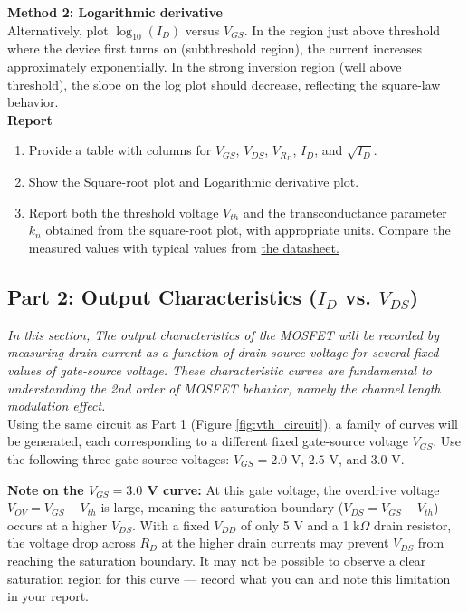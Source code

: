 \documentclass[10pt]{article}
\begin{document}
\textbf{Method 2: Logarithmic derivative} \\

Alternatively, plot $\log_{10}(I_D)$ versus $V_{GS}$. In the region just above threshold where the device first turns on (subthreshold region), the current increases approximately exponentially.  In the strong inversion region (well above threshold), the slope on the log plot should decrease, reflecting the square-law behavior. \\


\textbf{Report}
\begin {enumerate}
    \item Provide a table with columns for $V_{GS}$, $V_{DS}$, $V_{R_D}$, $I_D$, and $\sqrt{I_D}$. 
    \item Show the Square-root plot and Logarithmic derivative plot.
    \item Report both the threshold voltage $V_{th}$ and the transconductance parameter $k_n$ obtained from the square-root plot, with appropriate units. Compare the measured values with typical values from \hyperlink{https://ww1.microchip.com/downloads/en/devicedoc/2n7000-n-channel-enhancement-mode-vertical-dmos-fet-data-sheet-20005695a.pdf}{the datasheet.}\\
\end{enumerate}


\subsection {Part 2: Output Characteristics ($I_D$ vs. $V_{DS}$)}
\emph{In this section, The output characteristics of the MOSFET will be recorded by measuring drain current as a function of drain-source voltage for several fixed values of gate-source voltage. These characteristic curves are fundamental to understanding the 2nd order of MOSFET behavior, namely the channel length modulation effect.}\\


Using the same circuit as Part 1 (Figure \ref{fig:vth_circuit}), a family of curves will be generated, each corresponding to a different fixed gate-source voltage $V_{GS}$. Use the following three gate-source voltages: $V_{GS} = 2.0$ V, $2.5$ V, and $3.0$ V.

\textbf{Note on the $V_{GS} = 3.0$ V curve:} At this gate voltage, the overdrive voltage $V_{OV} = V_{GS} - V_{th}$ is large, meaning the saturation boundary ($V_{DS} = V_{GS} - V_{th}$) occurs at a higher $V_{DS}$. With a fixed $V_{DD}$ of only 5 V and a 1 k$\Omega$ drain resistor, the voltage drop across $R_D$ at the higher drain currents may prevent $V_{DS}$ from reaching the saturation boundary. It may not be possible to observe a clear saturation region for this curve — record what you can and note this limitation in your report.\\
\end{document}
